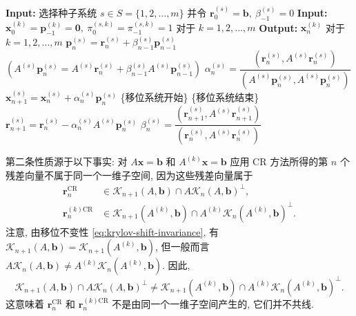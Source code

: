 \begin{algorithm}[H]\caption{{移位 CR 方法}}\label{alg:shifted-cr}\begin{algorithmic}[1]
\Statex\textbf{Input:} {选择种子系统 $s\in S=\{1,2,\ldots,m\}$ 并令 $\bm r_0^{(s)}=\bm b,\ \beta_{-1}^{(s)}=0$}
\Statex\textbf{Input:} $\bm x_0^{(k)}=\bm p_{-1}^{(k)}=\bm0,\ \pi_0^{(s,k)}=\pi_{-1}^{(s,k)}=1$ {对于} $k=1,2,\ldots,m$
\Statex\textbf{Output:} $\bm x_n^{(k)}$ {对于} $k=1,2,\ldots,m$
\State $\bm p_n^{(s)}=\bm r_n^{(s)}+\beta_{n-1}^{(s)}\bm p_{n-1}^{(s)}$
\State $(A^{(s)}\bm p_n^{(s)}=A^{(s)}\bm r_n^{(s)}+\beta_{n-1}^{(s)}A^{(s)}\bm p_{n-1}^{(s)})$
\State $\alpha_n^{(s)}=\dfrac{(\bm r_n^{(s)},A^{(s)}\bm r_n^{(s)})}{(A^{(s)}\bm p_n^{(s)},A^{(s)}\bm p_n^{(s)})}$
\State $\bm x_{n+1}^{(s)}=\bm x_n^{(s)}+\alpha_n^{(s)}\bm p_n^{(s)}$
\State \{{移位系统开始}\}
\State \{{移位系统结束}\}
\State $\bm r_{n+1}^{(s)}=\bm r_n^{(s)}-\alpha_n^{(s)}A^{(s)}\bm p_n^{(s)}$
\State $\beta_n^{(s)}=\dfrac{(\bm r_{n+1}^{(s)},A^{(s)}\bm r_{n+1}^{(s)})}{(\bm r_n^{(s)},A^{(s)}\bm r_n^{(s)})}$
\EndFor\end{algorithmic}\end{algorithm}
{第二条性质源于以下事实: 对 $A\bm x=\bm b$ 和 $A^{(k)}\bm x=\bm b$ 应用 CR 方法所得的第 $n$ 个残差向量不属于同一个一维子空间, 因为这些残差向量属于}
\[\begin{aligned}\bm r_n^{\mathrm{CR}}&\in\mathcal K_{n+1}(A,\bm b)\cap A\mathcal K_n(A,\bm b)^{\perp},\\\bm r_n^{(k)\mathrm{CR}}&\in\mathcal K_{n+1}(A^{(k)},\bm b)\cap A^{(k)}\mathcal K_n(A^{(k)},\bm b)^{\perp}.\end{aligned}\]
{注意, 由移位不变性 \eqref{eq:krylov-shift-invariance}, 有 $\mathcal K_{n+1}(A,\bm b)=\mathcal K_{n+1}(A^{(k)},\bm b)$, \newline{}但一般而言 $A\mathcal K_n(A,\bm b)\ne A^{(k)}\mathcal K_n(A^{(k)},\bm b)$. 因此,}
\[\mathcal K_{n+1}(A,\bm b)\cap A\mathcal K_n(A,\bm b)^{\perp}\ne\mathcal K_{n+1}(A^{(k)},\bm b)\cap A^{(k)}\mathcal K_n(A^{(k)},\bm b)^{\perp}.\]
{这意味着 $\bm r_n^{\mathrm{CR}}$ 和 $\bm r_n^{(k)\mathrm{CR}}$ 不是由同一个一维子空间产生的, 它们并不共线.}
